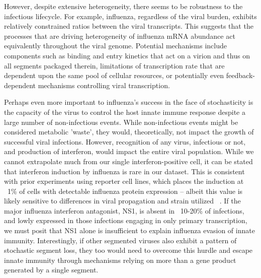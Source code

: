 \documentclass[9pt,lineno]{elife}
\begin{document}
However, despite extensive heterogeneity, there seems to be robustness to the infectious lifecycle.
For example, influenza, regardless of the viral burden, exhibits relatively constrained ratios between the viral transcripts.
This suggests that the processes that are driving heterogeneity of influenza mRNA abundance act equivalently throughout the viral genome.
Potential mechanisms include components such as binding and entry kinetics that act on a virion and thus on all segments packaged therein, limitations of transcription rate that are dependent upon the same pool of cellular resources, or potentially even feedback-dependent mechanisms controlling viral transcription. 

Perhaps even more important to influenza's success in the face of stochasticity is the capacity of the virus to control the host innate immune response despite a large number of non-infectious events. 
While non-infectious events might be considered metabolic 'waste', they would, theoretically, not impact the growth of successful viral infections. 
However, recognition of any virus, infectious or not, and production of interferon, would impact the entire viral population. 
While we cannot extrapolate much from our single interferon-positive cell, it can be stated that interferon induction by influenza is rare in our dataset. 
This is consistent with prior experiments using reporter cell lines,  which places the induction at ~1\% of cells with detectable influenza protein expression -- albeit this value is likely sensitive to differences in viral propagation and strain utilized ~\citep{Killip:2017ef, Chen:2010cr}. 
If the major influenza interferon antagonist, NS1, is absent in ~10-20\% of infections, and lowly expressed in those infections engaging in only primary transcription, we must posit that NS1 alone is insufficient to explain influenza evasion of innate immunity. 
Interestingly, if other segmented viruses also exhibit a pattern of stochastic segment loss, they too would need to overcome this hurdle and escape innate immunity through mechanisms relying on more than a gene product generated by a single segment.
\end{document}
